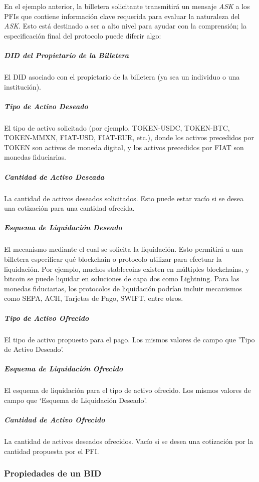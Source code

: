 \documentclass[11pt]{article}
\begin{document}
En el ejemplo anterior, la billetera solicitante transmitirá un mensaje \textit{ASK} a los PFIs que contiene información clave requerida para evaluar la naturaleza del \textit{ASK}. Esto está destinado a ser a alto nivel para ayudar con la comprensión; la especificación final del protocolo puede diferir algo: \ \ 

\subparagraph{DID del Propietario de la Billetera}

El DID asociado con el propietario de la billetera (ya sea un individuo o una institución).

\subparagraph{Tipo de Activo Deseado}

El tipo de activo solicitado (por ejemplo, TOKEN-USDC, TOKEN-BTC, TOKEN-MMXN, FIAT-USD, FIAT-EUR, etc.), donde los activos precedidos por TOKEN son activos de moneda digital, y los activos precedidos por FIAT son monedas fiduciarias.\textit{ }

\subparagraph{Cantidad de Activo Deseada}

La cantidad de activos deseados solicitados. Esto puede estar vacío si se desea una cotización para una cantidad ofrecida. 

\subparagraph{Esquema de Liquidación Deseado}

El mecanismo mediante el cual se solicita la liquidación. Esto permitirá a una billetera especificar qué blockchain o protocolo utilizar para efectuar la liquidación. Por ejemplo, muchos stablecoins existen en múltiples blockchains, y bitcoin se puede liquidar en soluciones de capa dos como Lightning. Para las monedas fiduciarias, los protocolos de liquidación podrían incluir mecanismos como SEPA, ACH, Tarjetas de Pago, SWIFT, entre otros.

\subparagraph{Tipo de Activo Ofrecido}

El tipo de activo propuesto para el pago. Los mismos valores de campo que 'Tipo de Activo Deseado'.

\subparagraph{Esquema de Liquidación Ofrecido}

El esquema de liquidación para el tipo de activo ofrecido. Los mismos valores de campo que ‘Esquema de Liquidación Deseado’.

\subparagraph{Cantidad de Activo Ofrecido}

La cantidad de activos deseados ofrecidos. Vacío si se desea una cotización por la cantidad propuesta por el PFI. 

\vspace{1\baselineskip}
\subsubsection{Propiedades de un BID}
\end{document}
